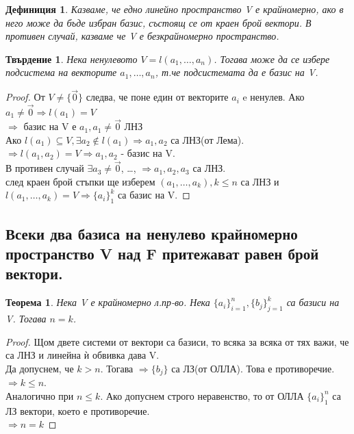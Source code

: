 \documentclass[fleqn,12pt]{article}
\newtheorem*{Th}{Теорема}
\newtheorem*{Def}{Дефиниция}
\newtheorem*{Claim}{Твърдение}
\begin{document}
\begin{justify}
\begin{Def}
    Казваме, че едно линейно пространство V е крайномерно, ако в него може да бъде избран базис,
    състоящ се от краен брой вектори. В противен случай, казваме че V е безкрайномерно пространство.
\end{Def}
\begin{Claim}
    Нека ненулевото $V = l(a_1,\dots,a_n)$. Тогава може да се избере подсистема на векторите
    $a_1,\dots,a_n$, т.че подсистемата да е базис на V.
\end{Claim}
\begin{proof}
    От $V \neq \{\vec{0}\}$ следва, че поне един от векторите $a_i$ e ненулев. Ако $a_1 \neq \vec{0}
    \Rightarrow l(a_1)=V$\\
    $\Rightarrow$ базис на V е $a_1, a_1 \neq \vec{0}$ ЛНЗ\\
    Ако $l(a_1) \subseteq V, \exists a_2 \notin l(a_1) \Rightarrow a_1,a_2$ са ЛНЗ(от Лема).\\
    $\Rightarrow l(a_1,a_2)=V \Rightarrow a_1,a_2$ - базис на V.\\
    В противен случай $\exists a_3 \neq \vec{0}$, \dots, $\Rightarrow a_1,a_2,a_3$ са ЛНЗ.\\
    след краен брой стъпки ще изберем $(a_1,\dots,a_k), k \leqslant n$ са ЛНЗ и $l(a_1,\dots,a_k)=V
    \Rightarrow \{a_i\}_1^k$ са базис на V.
\end{proof}

\subsection{Всеки два базиса на ненулево крайномерно пространство V над F притежават равен брой вектори.}
\begin{Th}
    Нека V е крайномерно л.пр-во. Нека $\{a_i\}_{i=1}^n, \{b_j\}_{j=1}^k$ са базиси на V. Тогава
    $n=k$.
\end{Th}
\begin{proof}
    Щом двете системи от вектори са базиси, то всяка за всяка от тях важи, че са ЛНЗ и линейна ѝ
    обвивка дава V.\\
    Да допуснем, че $k>n$. Тогава $\Rightarrow\{b_j\}$ са ЛЗ(от ОЛЛА). Това е противоречие.
    $\Rightarrow k \leq n$.\\
    Аналогично при $n \leq k$. Ако допуснем строго неравенство, то от ОЛЛА $\{a_i\}_1^n$ са ЛЗ
    вектори, което е противоречие.\\
    $\Rightarrow n=k$ 
\end{proof}


\end{justify}
\end{document}

